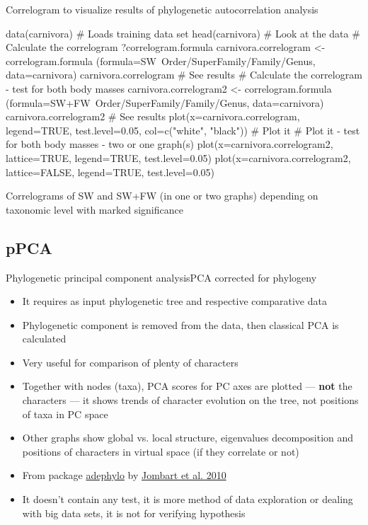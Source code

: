 \documentclass[compress, xelatex, 11pt, xcolor=svgnames, aspectratio=169,
	hyperref={
		bookmarks=true,
		unicode=true,
		colorlinks=true,
		pdftitle={Molecular data in R},
		plainpages=false,
		pdfauthor={Vojtech Zeisek},
		pdfsubject={Course about phylogeny and evolution in R},
		pdfcreator={XeLaTeX},
		pdfkeywords={R, evolution, phylogeny, molecular data},
		linkcolor=Crimson, %
		anchorcolor=Magenta, %
		citecolor=Magenta, %
		filecolor=Magenta, %
		menucolor=Magenta, %
		urlcolor=DodgerBlue, %
		},
	url={hyphens, lowtilde} %
	]{beamer}
\renewcommand{\texttt}[1]{\colorbox{Beige}{{\ttfamily #1}}}
\begin{document}
\begin{frame}[fragile]{Correlogram to visualize results of phylogenetic autocorrelation analysis}
	\begin{spluscode}
    data(carnivora) # Loads training data set
    head(carnivora) # Look at the data
    # Calculate the correlogram
    ?correlogram.formula
    carnivora.correlogram <- correlogram.formula
      (formula=SW~Order/SuperFamily/Family/Genus, data=carnivora)
    carnivora.correlogram # See results
    # Calculate the correlogram - test for both body masses
    carnivora.correlogram2 <- correlogram.formula
      (formula=SW+FW~Order/SuperFamily/Family/Genus, data=carnivora)
    carnivora.correlogram2 # See results
    plot(x=carnivora.correlogram, legend=TRUE, test.level=0.05, col=c("white",
      "black")) # Plot it
    # Plot it - test for both body masses - two or one graph(s)
    plot(x=carnivora.correlogram2, lattice=TRUE, legend=TRUE, test.level=0.05)
    plot(x=carnivora.correlogram2, lattice=FALSE, legend=TRUE, test.level=0.05)
	\end{spluscode}
\end{frame}

\begin{frame}{Correlograms of SW and SW+FW (in one or two graphs) depending on taxonomic level with marked significance}
	\texttt{[image: correlog.png]}
\end{frame}

\subsection{pPCA}

\begin{frame}{Phylogenetic principal component analysis}{PCA corrected for phylogeny}
	\begin{itemize}
		\item It requires as input phylogenetic tree and respective comparative data
		\item Phylogenetic component is removed from the data, then classical PCA is calculated
		\item Very useful for comparison of plenty of characters
		\item Together with nodes (taxa), PCA scores for PC axes are plotted --- \textbf{not} the characters --- it shows trends of character evolution on the tree, not positions of taxa in PC space
		\item Other graphs show global vs. local structure, eigenvalues decomposition and positions of characters in virtual space (if they correlate or not)
		\item From package \href{https://academic.oup.com/bioinformatics/article/26/15/1907/188748}{adephylo} by \href{https://www.sciencedirect.com/science/article/pii/S0022519310001736}{Jombart et al. 2010}
		\item It doesn't contain any test, it is more method of data exploration or dealing with big data sets, it is not for verifying hypothesis
	\end{itemize}
\end{frame}
\end{document}
